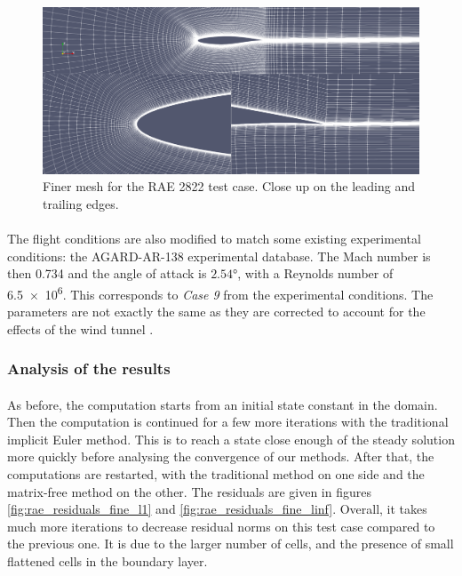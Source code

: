         \begin{figure}
          \centering
          \includegraphics[width=\textwidth]{figures/rae_mesh_fine.png}
          \caption{Finer mesh for the RAE 2822 test case. Close up on the leading and trailing edges.}
          \label{fig:rae_mesh_fine}
        \end{figure}

        \paragraph{}
        The flight conditions are also modified to match some existing experimental conditions: the AGARD-AR-138 experimental database.
        The Mach number is then 0.734 and the angle of attack is $2.54\si{\degree}$, with a Reynolds number of \num{6.5e6}.
        This corresponds to \emph{Case 9} from the experimental conditions.
        The parameters are not exactly the same as they are corrected to account for the effects of the wind tunnel \cite{HellstromDavidsonRizzi1994}.


      \subsubsection{Analysis of the results}

        \paragraph{}
        As before, the computation starts from an initial state constant in the domain.
        Then the computation is continued for a few more iterations with the traditional implicit Euler method.
        This is to reach a state close enough of the steady solution more quickly before analysing the convergence of our methods.
        After that, the computations are restarted, with the traditional method on one side and the matrix-free method on the other.
        The residuals are given in figures \ref{fig:rae_residuals_fine_l1} and \ref{fig:rae_residuals_fine_linf}.
        Overall, it takes much more iterations to decrease residual norms on this test case compared to the previous one.
        It is due to the larger number of cells, and the presence of small flattened cells in the boundary layer.

